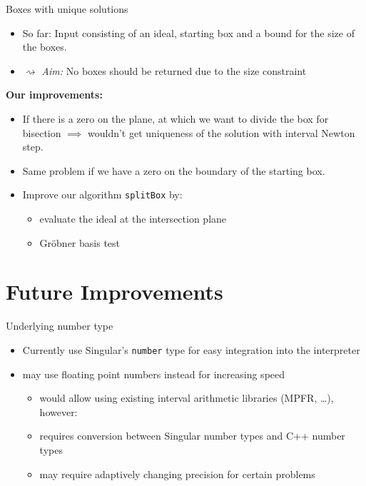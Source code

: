 \documentclass[german,10pt,xcolor=colortbl,compress]{beamer}
\begin{document}
\begin{frame}{Boxes with unique solutions}
    \begin {itemize}
        \item So far: Input consisting of an ideal, starting box and a bound for the size
            of the boxes.
        \item[]$\rightsquigarrow$ \emph{Aim:} No boxes should be returned due to the size
            constraint
    \end{itemize}
    \pause
    \textbf{Our improvements:}
    \begin{itemize}
        \item If there is a zero on the plane, at which we want to divide the box for
            bisection $\implies$ wouldn't get uniqueness of the solution with interval
            Newton step.
        \item Same problem if we have a zero on the boundary of the starting box.
        \item Improve our algorithm \texttt{splitBox} by:
        \begin{itemize}
            \item evaluate the ideal at the intersection plane
            \item Gröbner basis test
        \end{itemize}
    \end{itemize}
\end{frame}

\section{Future Improvements}

\begin{frame}{Underlying number type}
    \begin{itemize}
        \item Currently use Singular's \texttt{number} type for easy integration into the
            interpreter
        \item may use floating point numbers instead for increasing speed
            \begin{itemize}
                \item would allow using existing interval arithmetic libraries (MPFR,
                    \dots), however:
                \item requires conversion between Singular number types and C++ number
                    types
                \item may require adaptively changing precision for certain problems
            \end{itemize}
    \end{itemize}
\end{frame}
\end{document}
